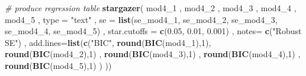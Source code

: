 \documentclass[]{article}
\newenvironment{Shaded}{\begin{snugshade}}{\end{snugshade}}
\newcommand{\CommentTok}[1]{\textcolor[rgb]{0.56,0.35,0.01}{\textit{#1}}}
\newcommand{\DataTypeTok}[1]{\textcolor[rgb]{0.13,0.29,0.53}{#1}}
\newcommand{\DecValTok}[1]{\textcolor[rgb]{0.00,0.00,0.81}{#1}}
\newcommand{\FloatTok}[1]{\textcolor[rgb]{0.00,0.00,0.81}{#1}}
\newcommand{\KeywordTok}[1]{\textcolor[rgb]{0.13,0.29,0.53}{\textbf{#1}}}
\newcommand{\NormalTok}[1]{#1}
\newcommand{\StringTok}[1]{\textcolor[rgb]{0.31,0.60,0.02}{#1}}
\begin{document}
\begin{Shaded}
\begin{Highlighting}[]
\CommentTok{# produce regression table}
\KeywordTok{stargazer}\NormalTok{(}
\NormalTok{    mod4_}\DecValTok{1}
\NormalTok{  , mod4_}\DecValTok{2}
\NormalTok{  , mod4_}\DecValTok{3}
\NormalTok{  , mod4_}\DecValTok{4}
\NormalTok{  , mod4_}\DecValTok{5}
\NormalTok{  , }\DataTypeTok{type =} \StringTok{"text"}
\NormalTok{  , }\DataTypeTok{se =} \KeywordTok{list}\NormalTok{(se_mod4_}\DecValTok{1}\NormalTok{, se_mod4_}\DecValTok{2}\NormalTok{, se_mod4_}\DecValTok{3}\NormalTok{, se_mod4_}\DecValTok{4}\NormalTok{, se_mod4_}\DecValTok{5}\NormalTok{)}
\NormalTok{  , }\DataTypeTok{star.cutoffs =} \KeywordTok{c}\NormalTok{(}\FloatTok{0.05}\NormalTok{, }\FloatTok{0.01}\NormalTok{, }\FloatTok{0.001}\NormalTok{)}
\NormalTok{  , }\DataTypeTok{notes=} \KeywordTok{c}\NormalTok{(}\StringTok{"Robust SE"}\NormalTok{)}
\NormalTok{  , }\DataTypeTok{add.lines=}\KeywordTok{list}\NormalTok{(}\KeywordTok{c}\NormalTok{(}\StringTok{"BIC"}\NormalTok{, }\KeywordTok{round}\NormalTok{(}\KeywordTok{BIC}\NormalTok{(mod4_}\DecValTok{1}\NormalTok{),}\DecValTok{1}\NormalTok{), }\KeywordTok{round}\NormalTok{(}\KeywordTok{BIC}\NormalTok{(mod4_}\DecValTok{2}\NormalTok{),}\DecValTok{1}\NormalTok{) , }\KeywordTok{round}\NormalTok{(}\KeywordTok{BIC}\NormalTok{(mod4_}\DecValTok{3}\NormalTok{),}\DecValTok{1}\NormalTok{) , }\KeywordTok{round}\NormalTok{(}\KeywordTok{BIC}\NormalTok{(mod4_}\DecValTok{4}\NormalTok{),}\DecValTok{1}\NormalTok{) , }\KeywordTok{round}\NormalTok{(}\KeywordTok{BIC}\NormalTok{(mod4_}\DecValTok{5}\NormalTok{),}\DecValTok{1}\NormalTok{)}
\NormalTok{                     )}
\NormalTok{))}
\end{Highlighting}
\end{Shaded}
\end{document}
